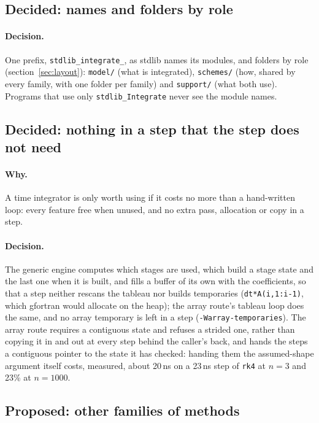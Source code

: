 \documentclass[11pt,a4paper]{article}
\newcommand{\code}[1]{\texttt{#1}}
\begin{document}
\subsection{Decided: names and folders by role}

\paragraph{Decision.} One prefix, \code{stdlib\_integrate\_}, as stdlib names
its modules, and folders by role (section~\ref{sec:layout}): \code{model/}
(what is integrated), \code{schemes/} (how, shared by every family, with one
folder per family) and \code{support/} (what both use). Programs that use only
\code{stdlib\_Integrate} never see the module names.

\subsection{Decided: nothing in a step that the step does not need}

\paragraph{Why.} A time integrator is only worth using if it costs no more
than a hand-written loop: every feature free when unused, and no extra pass,
allocation or copy in a step.

\paragraph{Decision.} The generic engine computes which stages are used,
which build a stage state and the last one when it is built, and fills a
buffer of its own with the coefficients, so that a step neither rescans the
tableau nor builds temporaries (\code{dt*A(i,1:i-1)}, which gfortran would
allocate on the heap); the array route's tableau loop does the same, and no
array temporary is left in a step (\code{-Warray-temporaries}). The array
route requires a contiguous state and refuses a strided one, rather than
copying it in and out at every step behind the caller's back, and hands the
steps a contiguous pointer to the state it has checked: handing them the
assumed-shape argument itself costs, measured, about 20\,ns on a 23\,ns step
of \code{rk4} at $n = 3$ and 23\% at $n = 1000$.

\subsection{Proposed: other families of methods}
\label{sec:families}
\end{document}
